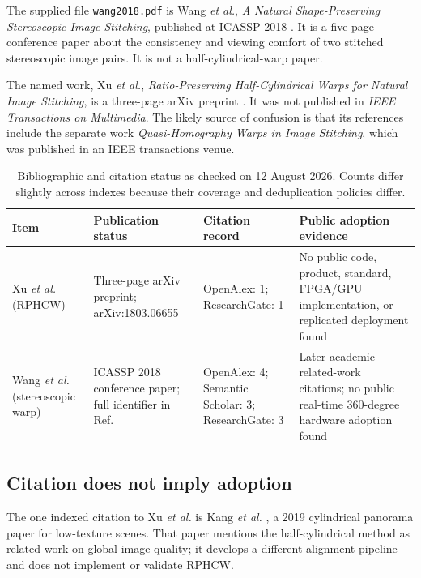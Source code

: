 \documentclass[10pt]{article}
\newcommand{\RPHCW}{RPHCW}
\begin{document}
The supplied file \texttt{wang2018.pdf} is Wang \emph{et al.}, \emph{A Natural Shape-Preserving Stereoscopic Image Stitching}, published at ICASSP 2018 \cite{wang2018}. It is a five-page conference paper about the consistency and viewing comfort of two stitched stereoscopic image pairs. It is not a half-cylindrical-warp paper.

The named work, Xu \emph{et al.}, \emph{Ratio-Preserving Half-Cylindrical Warps for Natural Image Stitching}, is a three-page arXiv preprint \cite{xu2018}. It was not published in \emph{IEEE Transactions on Multimedia}. The likely source of confusion is that its references include the separate work \emph{Quasi-Homography Warps in Image Stitching}, which was published in an IEEE transactions venue.

\begin{table}[ht]
\centering
\caption{Bibliographic and citation status as checked on 12 August 2026. Counts differ slightly across indexes because their coverage and deduplication policies differ.}
\label{tab:citation-audit}
\small
\begin{tabularx}{\textwidth}{@{}
>{\raggedright\arraybackslash}p{2.4cm}
>{\raggedright\arraybackslash}p{3.6cm}
>{\raggedright\arraybackslash}p{3.0cm}
Y@{}}
\toprule
Item & Publication status & Citation record & Public adoption evidence \\
\midrule
Xu \emph{et al.} (RPHCW) & Three-page arXiv preprint; arXiv:1803.06655 & OpenAlex: 1; ResearchGate: 1 & No public code, product, standard, FPGA/GPU implementation, or replicated deployment found \\
Wang \emph{et al.} (stereoscopic warp) & ICASSP 2018 conference paper; full identifier in Ref.~\cite{wang2018} & OpenAlex: 4; Semantic Scholar: 3; ResearchGate: 3 & Later academic related-work citations; no public real-time 360-degree hardware adoption found \\
\bottomrule
\end{tabularx}
\end{table}

\subsection{Citation does not imply adoption}

The one indexed citation to Xu \emph{et al.} is Kang \emph{et al.} \cite{kang2019}, a 2019 cylindrical panorama paper for low-texture scenes. That paper mentions the half-cylindrical method as related work on global image quality; it develops a different alignment pipeline and does not implement or validate \RPHCW.
\end{document}
